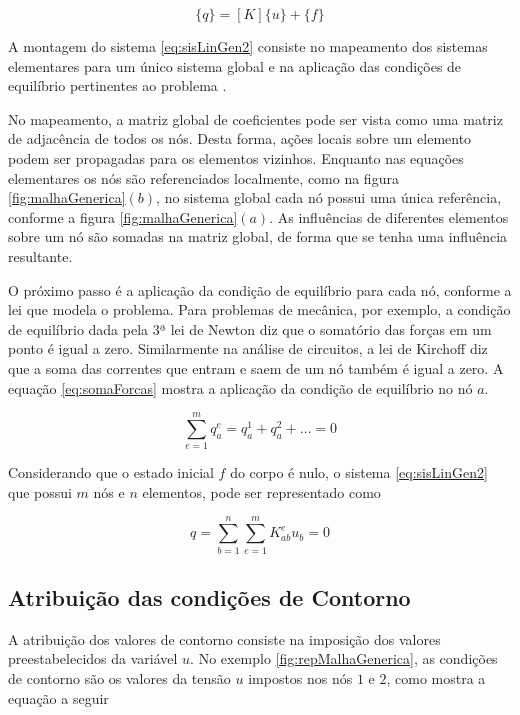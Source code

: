 \documentclass[
    12pt,               %
    openright,          %
    oneside,
    a4paper,            %
    english,            %
    french,             %
    spanish,            %
    brazil              %
    ]{abntex2}
\begin{document}
 \begin{equation}
 \label{eq:sisLinGen2}
    \{q\} = [K] \{u\} + \{f\}
 \end{equation}
 
A montagem do sistema \ref{eq:sisLinGen2} consiste no mapeamento dos sistemas elementares para um único sistema global e na aplicação das condições de equilíbrio pertinentes ao problema \cite[p. 5]{zien}.

No mapeamento, a matriz global de coeficientes pode ser vista como uma matriz de adjacência de todos os nós. Desta forma, ações locais sobre um elemento podem ser propagadas para os elementos vizinhos.
Enquanto nas equações elementares os nós são referenciados localmente, como na figura \ref{fig:malhaGenerica}$(b)$, no sistema global cada nó possui uma única referência, conforme a figura \ref{fig:malhaGenerica}$(a)$. As influências de diferentes elementos sobre um nó são somadas na matriz global, de forma que se tenha uma influência resultante.

O próximo passo é a aplicação da condição de equilíbrio para cada nó, conforme a lei que modela o problema. Para problemas de mecânica, por exemplo, a condição de equilíbrio dada pela 3ª lei de Newton diz que o somatório das forças em um ponto é igual a zero. Similarmente na análise de circuitos, a lei de Kirchoff diz que a soma das correntes que entram e saem de um nó também é igual a zero. A equação \ref{eq:somaForcas} mostra a aplicação da condição de equilíbrio no nó $a$.

 
  \begin{equation}
    \label{eq:somaForcas}
    \sum_{e=1}^{m}{q_a^e = q_a^1 + q_a^2 + \dots = 0}
  \end{equation}
  
  Considerando que o estado inicial $f$ do corpo é nulo, o sistema \ref{eq:sisLinGen2} que possui $m$ nós e $n$ elementos, pode ser representado como 
  
    \begin{equation}
        \label{eq:equilibrio}
        q =
        \sum_{b=1}^{n}\sum_{e=1}^{m}{K_{ab}^e u_b = 0}
    \end{equation}
    
    
\subsection{Atribuição das condições de Contorno}
A atribuição dos valores de contorno consiste na imposição dos valores preestabelecidos da variável $u$. No exemplo \ref{fig:repMalhaGenerica}, as condições de contorno são os valores da tensão $u$  impostos nos nós $1$ e $2$, como mostra a equação a seguir
\end{document}
